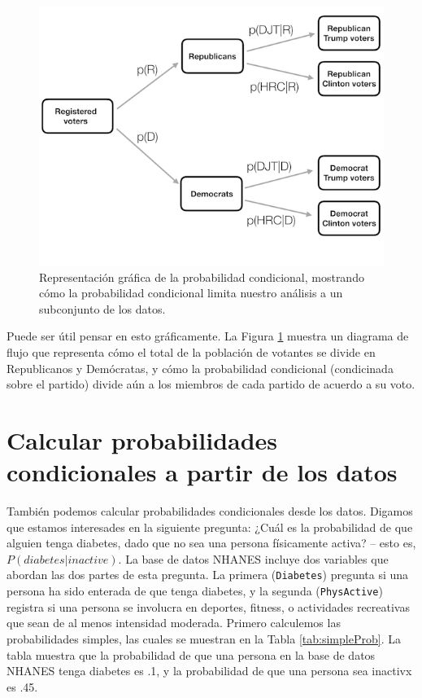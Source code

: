 \documentclass[
  12pt,
]{book}
\begin{document}
\begin{figure}
\includegraphics[width=8in,height=0.5\textheight]{images/conditional_probability} \caption{Representación gráfica de la probabilidad condicional, mostrando cómo la probabilidad condicional limita nuestro análisis a un subconjunto de los datos.}\label{fig:conditionalProbability}
\end{figure}

Puede ser útil pensar en esto gráficamente. La Figura \ref{fig:conditionalProbability} muestra un diagrama de flujo que representa cómo el total de la población de votantes se divide en Republicanos y Demócratas, y cómo la probabilidad condicional (condicinada sobre el partido) divide aún a los miembros de cada partido de acuerdo a su voto.

\hypertarget{calcular-probabilidades-condicionales-a-partir-de-los-datos}{%
\section{Calcular probabilidades condicionales a partir de los datos}\label{calcular-probabilidades-condicionales-a-partir-de-los-datos}}

También podemos calcular probabilidades condicionales desde los datos. Digamos que estamos interesades en la siguiente pregunta: ¿Cuál es la probabilidad de que alguien tenga diabetes, dado que no sea una persona físicamente activa? -- esto es, \(P(diabetes|inactive)\). La base de datos NHANES incluye dos variables que abordan las dos partes de esta pregunta. La primera (\texttt{Diabetes}) pregunta si una persona ha sido enterada de que tenga diabetes, y la segunda (\texttt{PhysActive}) registra si una persona se involucra en deportes, fitness, o actividades recreativas que sean de al menos intensidad moderada. Primero calculemos las probabilidades simples, las cuales se muestran en la Tabla \ref{tab:simpleProb}. La tabla muestra que la probabilidad de que una persona en la base de datos NHANES tenga diabetes es .1, y la probabilidad de que una persona sea inactivx es .45.
\end{document}
